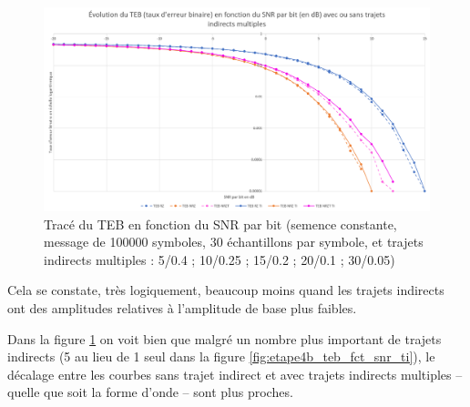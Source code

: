 \begin{figure}[H]
    \centering
    \includegraphics[width=\textwidth]{img/etape4b_teb_fct_snr_ti_multiples.png}
    \caption{Tracé du TEB en fonction du SNR par bit (semence constante, message de 100000 symboles, 30 échantillons par symbole, et trajets indirects multiples : 5/0.4 ; 10/0.25 ; 15/0.2 ; 20/0.1 ; 30/0.05)}
    \label{fig:etape4b_teb_fct_snr_ti_multiples}
\end{figure}


Cela se constate, très logiquement, beaucoup moins quand les trajets indirects ont des amplitudes relatives à l'amplitude de base plus faibles.

Dans la figure \ref{fig:etape4b_teb_fct_snr_ti_multiples} on voit bien que malgré un nombre plus important de trajets indirects (5 au lieu de 1 seul dans la figure \ref{fig:etape4b_teb_fct_snr_ti}), le décalage entre les courbes sans trajet indirect et avec trajets indirects multiples – quelle que soit la forme d'onde – sont plus proches.